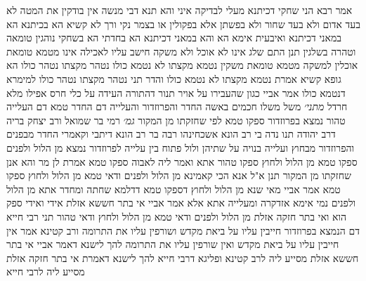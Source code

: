 \documentclass[12pt, openany]{book}
\begin{document}
{אמר רבא הני שחקי דכיתנא מעלי לבדיקה איני והא תנא דבי מנשה אין בודקין את המטה לא בעד אדום ולא בעד שחור ולא בפשתן אלא בפקולין או בצמר נקי ורך 
לא קשיא הא בכיתנא הא במאני דכיתנא ואיבעית אימא הא והא במאני דכיתנא הא בחדתי הא בשחקי 
נוהגין טומאה וטהרה בשלגין תנן התם שלג אינו לא אוכל ולא משקה חישב עליו לאכילה אינו מטמא טומאת אוכלין למשקה מטמא טומאת משקין 
נטמא מקצתו לא נטמא כולו נטהר מקצתו נטהר כולו 
הא גופא קשיא אמרת נטמא מקצתו לא נטמא כולו והדר תני נטהר מקצתו נטהר כולו למימרא דנטמא כולו 
אמר אביי כגון שהעבירו על אויר תנור דהתורה העידה על כלי חרס
אפילו מלא חרדל 
{\large\emph{מתני׳}} משל משלו חכמים באשה החדר והפרוזדור והעלייה 
דם החדר טמא דם העלייה טהור נמצא בפרוזדור ספקו טמא לפי שחזקתו מן המקור
{\large\emph{גמ׳}} רמי בר שמואל ורב יצחק בריה דרב יהודה תנו נדה בי רב הונא אשכחינהו רבה בר רב הונא דיתבי וקאמרי החדר מבפנים והפרוזדור מבחוץ ועלייה בנויה על שתיהן ולול פתוח בין עלייה לפרוזדור
 נמצא מן הלול ולפנים ספקו טמא מן הלול ולחוץ ספקו טהור 
אתא ואמר ליה לאבוה ספקו טמא אמרת לן מר והא אנן שחזקתו מן המקור תנן 
א"ל אנא הכי קאמינא מן הלול ולפנים ודאי טמא מן הלול ולחוץ ספקו טמא 
אמר אביי מאי שנא מן הלול ולחוץ דספקו טמא דדלמא שחתה ומחדר אתא מן הלול ולפנים נמי אימא אזדקרה ומעלייה אתא 
אלא אמר אביי אי בתר חששא אזלת אידי ואידי ספק הוא ואי בתר חזקה אזלת מן הלול ולפנים ודאי טמא מן הלול ולחוץ ודאי טהור 
תני רבי חייא דם הנמצא בפרוזדור חייבין עליו על ביאת מקדש ושורפין עליו את התרומה ורב קטינא אמר אין חייבין עליו על ביאת מקדש ואין שורפין עליו את התרומה 
להך לישנא דאמר אביי אי בתר חששא אזלת מסייע ליה לרב קטינא ופליגא דרבי חייא
להך לישנא דאמרת אי בתר חזקה אזלת מסייע ליה לרבי חייא}
\end{document}
